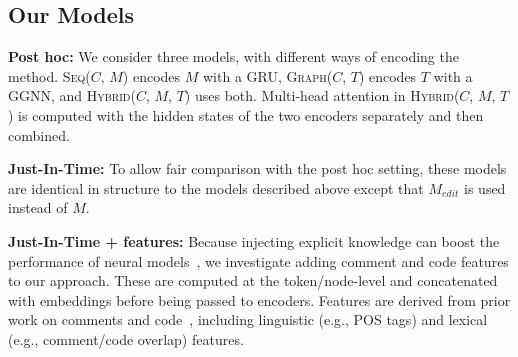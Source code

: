 \documentclass[letterpaper]{article} %
\newcommand{\Comment}{$C$}
\newcommand{\NewCode}{$M$}
\newcommand{\Posthoc}{post hoc}
\newcommand{\EditCode}{$M_{edit}$}
\newcommand{\NewTree}{$T$}
\newcommand{\SeqModel}{\textsc{Seq}}
\newcommand{\GraphModel}{\textsc{Graph}}
\newcommand{\HybridModel}{\textsc{Hybrid}}
\newcommand{\PosthocSeq}{\SeqModel{}(\Comment{}, \NewCode{})}
\newcommand{\PosthocGraph}{\GraphModel{}(\Comment{}, \NewTree{})}
\newcommand{\PosthocHybrid}{\HybridModel{}(\Comment{}, \NewCode{}, \NewTree{})}
\begin{document}
\subsection{Our Models}
\label{subsection:models}
\noindent\textbf{Post hoc:} We consider three models, with different ways of encoding the method. \PosthocSeq{} encodes \NewCode{} with a GRU, \PosthocGraph{} encodes \NewTree{} with a GGNN, and \PosthocHybrid{} uses both. Multi-head attention in \PosthocHybrid{} is computed with the hidden states of the two encoders separately and then combined.

\noindent\textbf{Just-In-Time:} To allow fair comparison with the \Posthoc{} setting, these models are identical in structure to the models described above except that \EditCode{} is used instead of \NewCode{}. 

\noindent\textbf{Just-In-Time + features:}
Because injecting explicit knowledge can boost the performance of neural models~\cite{ChenExplicitFeatures,XuanExternalFeatures}, we investigate adding comment and code features to our approach. These are computed at the token/node-level and concatenated with embeddings before being passed to encoders.  Features are derived from prior work on comments and code~\cite{panthaplackel2020associating, panthaplackel2020update}, including linguistic (e.g., POS tags) and lexical (e.g., comment/code overlap) features.
\end{document}
